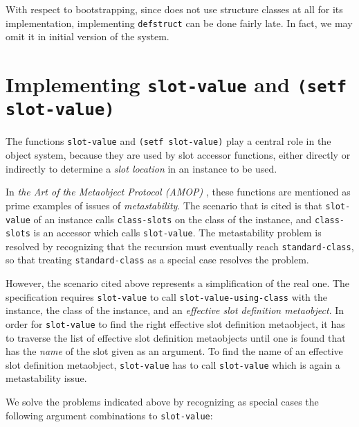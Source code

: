 With respect to bootstrapping, since \sysname{} does not use structure
classes at all for its implementation, implementing \texttt{defstruct}
can be done fairly late.  In fact, we may omit it in initial version
of the system. 

\section{Implementing \texttt{slot-value} and \texttt{(setf slot-value)}}

The functions \texttt{slot-value} and \texttt{(setf slot-value)} play
a central role in the object system, because they are used by slot
accessor functions, either directly or indirectly to determine a
\emph{slot location} in an instance to be used.  

In \emph{the Art of the Metaobject Protocol (AMOP)}
\cite{Kiczales:1991:AMP:574212}, these functions are mentioned as
prime examples of issues of \emph{metastability}.  The scenario that
is cited is that \texttt{slot-value} of an instance calls
\texttt{class-slots} on the class of the instance, and
\texttt{class-slots} is an accessor which calls \texttt{slot-value}.
The metastability problem is resolved by recognizing that the
recursion must eventually reach \texttt{standard-class}, so that
treating \texttt{standard-class} as a special case resolves the
problem.

However, the scenario cited above represents a simplification of the
real one.  The specification requires \texttt{slot-value} to call
\texttt{slot-value-using-class} with the instance, the class of the
instance, and an \emph{effective slot definition metaobject}.  In
order for \texttt{slot-value} to find the right effective slot
definition metaobject, it has to traverse the list of effective slot
definition metaobjects until one is found that has the \emph{name} of
the slot given as an argument.  To find the name of an effective slot
definition metaobject, \texttt{slot-value} has to call
\texttt{slot-value} which is again a metastability issue. 

We solve the problems indicated above%
by recognizing as special cases
the following argument combinations to \texttt{slot-value}:

